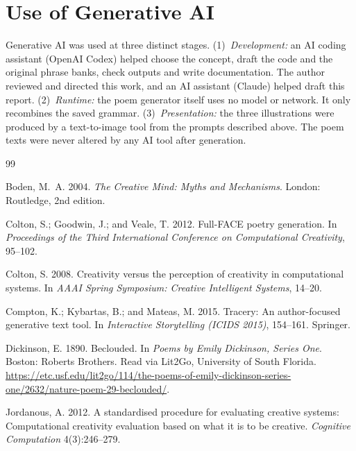 \documentclass[letterpaper]{article}
\begin{document}
\section{Use of Generative AI}
Generative AI was used at three distinct stages. (1)~\emph{Development:}
an AI coding assistant (OpenAI Codex) helped choose the concept, draft
the code and the original phrase banks, check outputs and write
documentation. The author reviewed and directed this work, and an AI
assistant (Claude) helped draft this report. (2)~\emph{Runtime:} the
poem generator itself uses no model or network. It only recombines the
saved grammar. (3)~\emph{Presentation:} the three illustrations were
produced by a text-to-image tool from the prompts described above. The
poem texts were never altered by any AI tool after generation.


\begin{thebibliography}{99}

Boden, M.~A. 2004.
\newblock \emph{The Creative Mind: Myths and Mechanisms}.
\newblock London: Routledge, 2nd edition.

Colton, S.; Goodwin, J.; and Veale, T. 2012.
\newblock Full-{FACE} poetry generation.
\newblock In \emph{Proceedings of the Third International Conference on
Computational Creativity}, 95--102.

Colton, S. 2008.
\newblock Creativity versus the perception of creativity in
computational systems.
\newblock In \emph{AAAI Spring Symposium: Creative Intelligent Systems},
14--20.

Compton, K.; Kybartas, B.; and Mateas, M. 2015.
\newblock Tracery: An author-focused generative text tool.
\newblock In \emph{Interactive Storytelling (ICIDS 2015)}, 154--161.
Springer.

Dickinson, E. 1890.
\newblock Beclouded.
\newblock In \emph{Poems by Emily Dickinson, Series One}. Boston: Roberts
Brothers. Read via Lit2Go, University of South Florida.
\newblock \url{https://etc.usf.edu/lit2go/114/the-poems-of-emily-dickinson-series-one/2632/nature-poem-29-beclouded/}.

Jordanous, A. 2012.
\newblock A standardised procedure for evaluating creative systems:
Computational creativity evaluation based on what it is to be creative.
\newblock \emph{Cognitive Computation} 4(3):246--279.


\end{thebibliography}
\end{document}

